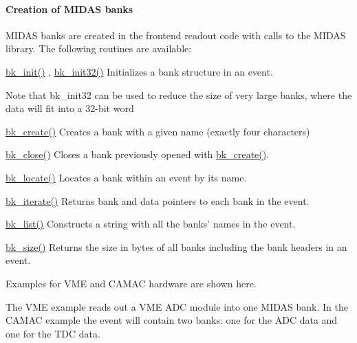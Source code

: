  \label{FE_bank_construction_idx_Midas_bank}
\hypertarget{FE_bank_construction_idx_Midas_bank}{}
 \hypertarget{FE_bank_construction_FE_creation_Midas_banks}{}\paragraph{Creation of MIDAS banks}\label{FE_bank_construction_FE_creation_Midas_banks}
MIDAS banks are created in the frontend readout code with calls to the MIDAS library. The following routines are available:
\begin{DoxyItemize}
\item \hyperlink{group__bkfunctionc_gac6fadde40824dbf7bd70abedd29be2bd}{bk\_\-init()} , \hyperlink{group__bkfunctionc_gae7cbf587db63fcdf66dd18b29f08b6d2}{bk\_\-init32()} Initializes a bank structure in an event. \par
Note that bk\_\-init32 can be used to reduce the size of very large banks, where the data will fit into a 32-\/bit word
\item \hyperlink{group__bkfunctionc_ga4bb781187e18834136ed8ac368d53413}{bk\_\-create()} Creates a bank with a given name (exactly four characters)
\item \hyperlink{group__bkfunctionc_ga132dc71c8f74b478cdcc59bc1d9f6a26}{bk\_\-close()} Closes a bank previously opened with \hyperlink{group__bkfunctionc_ga4bb781187e18834136ed8ac368d53413}{bk\_\-create()}.
\item \hyperlink{group__bkfunctionc_gafe085ddb11bdcff4ca461224254289ef}{bk\_\-locate()} Locates a bank within an event by its name.
\item \hyperlink{group__bkfunctionc_gab6012589013da85b128d8443501a4a44}{bk\_\-iterate()} Returns bank and data pointers to each bank in the event.
\item \hyperlink{group__bkfunctionc_ga4d8a0ef23239ae478544fa96a0e98a33}{bk\_\-list()} Constructs a string with all the banks' names in the event.
\item \hyperlink{group__bkfunctionc_ga8fc93de36e62c4328cb6581be7f42a0f}{bk\_\-size()} Returns the size in bytes of all banks including the bank headers in an event.
\end{DoxyItemize}

\par
 Examples for VME and CAMAC hardware are shown here.

The VME example reads out a VME ADC module into one MIDAS bank. In the CAMAC example the event will contain two banks: one for the ADC data and one for the TDC data.

